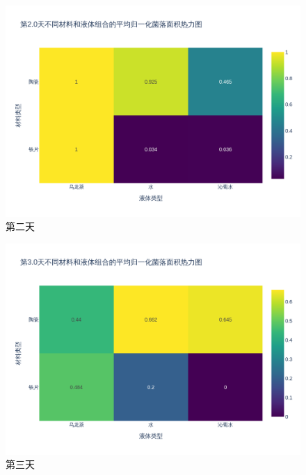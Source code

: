\documentclass[12pt,a4paper]{ctexart}
\begin{document}
\begin{figure}[H]  %
    \centering  %
    \includegraphics[width=\textwidth]{./plot/SingleDay/heatmap_normalized_day2.0.png}  %
    \caption{第二天}  %
    \label{fig:SingleDayHeat2}  %
\end{figure}

\begin{figure}[H]  %
    \centering  %
    \includegraphics[width=\textwidth]{./plot/SingleDay/heatmap_normalized_day3.0.png}  %
    \caption{第三天}  %
    \label{fig:SingleDayHeat3}  %
\end{figure}
\end{document}
